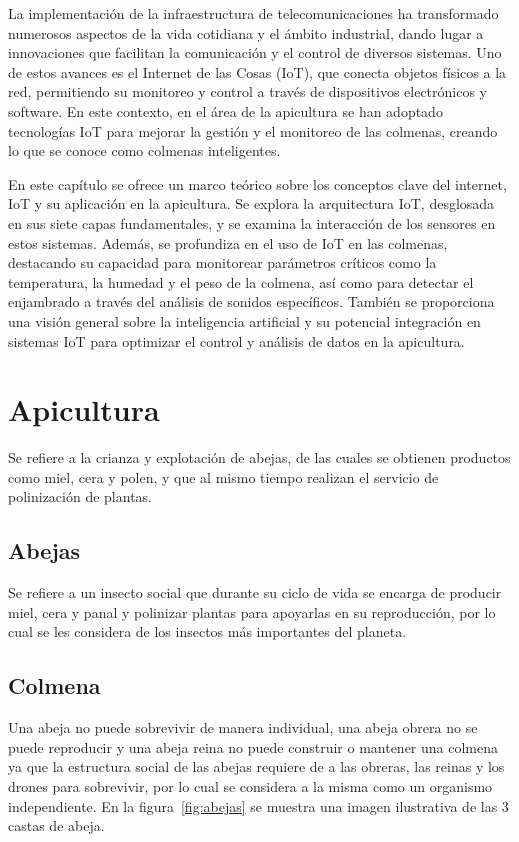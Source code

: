 La implementación de la infraestructura de telecomunicaciones ha transformado numerosos aspectos de la vida cotidiana y el ámbito industrial, dando lugar a innovaciones que facilitan la comunicación y el control de diversos sistemas. Uno de estos avances es el Internet de las Cosas (IoT), que conecta objetos físicos a la red, permitiendo su monitoreo y control a través de dispositivos electrónicos y software. En este contexto, en el área de la apicultura se han adoptado tecnologías IoT para mejorar la gestión y el monitoreo de las colmenas, creando lo que se conoce como colmenas inteligentes.

En este capítulo se ofrece un marco teórico sobre los conceptos clave del internet, IoT y su aplicación en la apicultura. Se explora la arquitectura IoT, desglosada en sus siete capas fundamentales, y se examina la interacción de los sensores en estos sistemas. Además, se profundiza en el uso de IoT en las colmenas, destacando su capacidad para monitorear parámetros críticos como la temperatura, la humedad y el peso de la colmena, así como para detectar el enjambrado a través del análisis de sonidos específicos. También se proporciona una visión general sobre la inteligencia artificial y su potencial integración en sistemas IoT para optimizar el control y análisis de datos en la apicultura.
\section{Apicultura}
Se refiere a la crianza y explotación de abejas, de las cuales se obtienen productos como miel, cera y polen, y que al mismo tiempo realizan el servicio de polinización de plantas.

\subsection{Abejas}
Se refiere a un insecto social que durante su ciclo de vida se encarga de producir miel, cera y panal y polinizar plantas para apoyarlas en su reproducción, por lo cual se les considera de los insectos más importantes del planeta.  \cite{david_cramp}

\subsection{Colmena}
Una abeja no puede sobrevivir de manera individual, una abeja obrera no se puede reproducir y una abeja reina no puede construir o mantener una colmena ya que la estructura social de las abejas requiere de a las obreras, las reinas y los drones para sobrevivir, por lo cual se considera a la misma como un organismo independiente. \cite{david_cramp} En la figura~\ref{fig:abejas} se muestra una imagen ilustrativa de las 3 castas de abeja.

